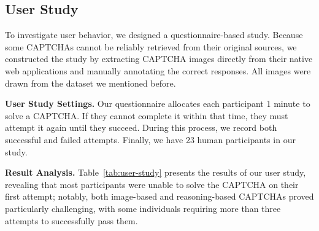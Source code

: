 \subsection{User Study}

To investigate user behavior, we designed a questionnaire-based study. Because some CAPTCHAs cannot be reliably retrieved from their original sources, we constructed the study by extracting CAPTCHA images directly from their native web applications and manually annotating the correct responses. All images were drawn from the dataset we mentioned before.

\noindent\textbf{User Study Settings.} Our questionnaire allocates each participant 1 minute to solve a CAPTCHA. If they cannot complete it within that time, they must attempt it again until they succeed. During this process, we record both successful and failed attempts. Finally, we have 23 human participants in our study.

\noindent\textbf{Result Analysis.} Table~\ref{tab:user-study} presents the results of our user study, revealing that most participants were unable to solve the CAPTCHA on their first attempt; notably, both image-based and reasoning-based CAPTCHAs proved particularly challenging, with some individuals requiring more than three attempts to successfully pass them.


\begin{center}
    \setlength{\fboxrule}{1pt}
\end{center}










